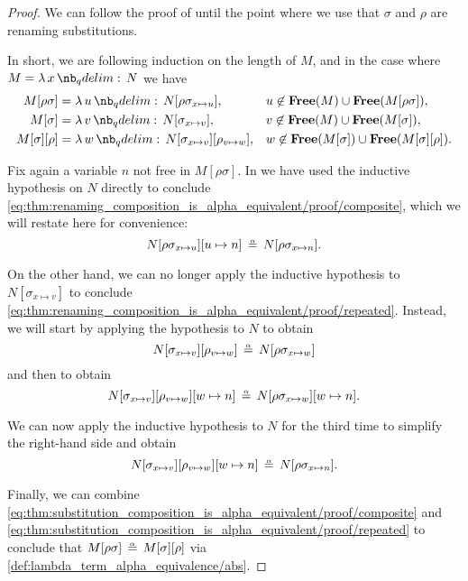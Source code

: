 \begin{proof}
  We can follow the proof of  until the point where we use that \( \sigma \) and \( \rho \) are renaming substitutions.

  In short, we are following induction on the length of \( M \), and in the case where \( M = \qabs x N \) we have
  \begin{align*}
    M[\rho\sigma]   &= \qabs u N[\rho\sigma_{x \mapsto u}],                 &&u \not\in \op*{Free}(M) \cup \op*{Free}(M[\rho\sigma]), \\
    M[\sigma]       &= \qabs v N[\sigma_{x \mapsto v}],                     &&v \not\in \op*{Free}(M) \cup \op*{Free}(M[\sigma]), \\
    M[\sigma][\rho] &= \qabs w N[\sigma_{x \mapsto v}][\rho_{v \mapsto w}], &&w \not\in \op*{Free}(M[\sigma]) \cup \op*{Free}(M[\sigma][\rho]).
  \end{align*}

  Fix again a variable \( n \) not free in \( M[\rho\sigma] \). In  we have used the inductive hypothesis on \( N \) directly to conclude \eqref{eq:thm:renaming_composition_is_alpha_equivalent/proof/composite}, which we will restate here for convenience:
  \begin{equation}\label{eq:thm:substitution_composition_is_alpha_equivalent/proof/composite}
    N[\rho\sigma_{x \mapsto u}][u \mapsto n] \aequiv N[\rho\sigma_{x \mapsto n}].
  \end{equation}

  On the other hand, we can no longer apply the inductive hypothesis to \( N[\sigma_{x \mapsto v}] \) to conclude \eqref{eq:thm:renaming_composition_is_alpha_equivalent/proof/repeated}. Instead, we will start by applying the hypothesis to \( N \) to obtain
  \begin{equation*}
    N[\sigma_{x \mapsto v}][\rho_{v \mapsto w}] \aequiv N[\rho\sigma_{x \mapsto w}]
  \end{equation*}
  and then  to obtain
  \begin{equation*}
    N[\sigma_{x \mapsto v}][\rho_{v \mapsto w}][w \mapsto n] \aequiv N[\rho\sigma_{x \mapsto w}][w \mapsto n].
  \end{equation*}

  We can now apply the inductive hypothesis to \( N \) for the third time to simplify the right-hand side and obtain
  \begin{equation}\label{eq:thm:substitution_composition_is_alpha_equivalent/proof/repeated}
    N[\sigma_{x \mapsto v}][\rho_{v \mapsto w}][w \mapsto n] \aequiv N[\rho\sigma_{x \mapsto n}].
  \end{equation}

  Finally, we can combine \eqref{eq:thm:substitution_composition_is_alpha_equivalent/proof/composite} and \eqref{eq:thm:substitution_composition_is_alpha_equivalent/proof/repeated} to conclude that \( M[\rho\sigma] \aequiv M[\sigma][\rho] \) via \ref{def:lambda_term_alpha_equivalence/abs}.
\end{proof}

